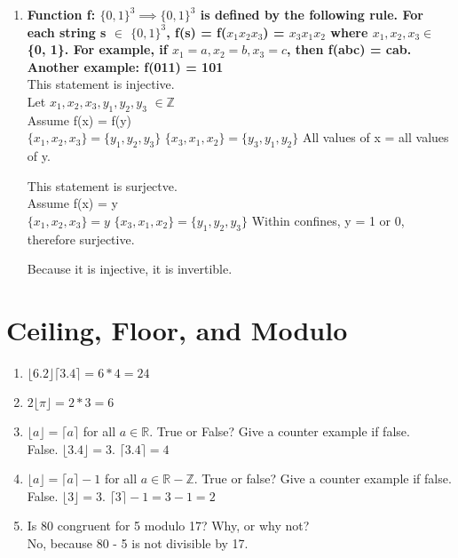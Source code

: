 \documentclass[a4paper]{article}
\begin{document}
\begin{enumerate}
    
    \item \boldmath \textbf{Function f: $\{0, 1\}^3 \implies \{0, 1\}^3$ is defined by the following rule. For each string s $\in$ $\{0, 1\}^3$, f(s) = f($x_1x_2x_3$) = $x_3x_1x_2$ where $x_1, x_2, x_3 \in$ \{0, 1\}. For example, if $x_1 = a, x_2 = b, x_3 = c$, then f(abc) = cab. Another example: f(011) = 101} \unboldmath \\
    This statement is injective. \\
    Let $x_1, x_2, x_3, y_1, y_2, y_3$ $\in \mathbb{Z}$ \\
    Assume f(x) = f(y) \\
    $\{x_1, x_2, x_3\} = \{y_1, y_2, y_3\}$
    $\{x_3, x_1, x_2\} = \{y_3, y_1, y_2\}$
    All values of x = all values of y.
    
    This statement is surjectve.\\
    Assume f(x) = y \\
    $\{x_1, x_2, x_3\} = y$
    $\{x_3, x_1, x_2\} = \{y_1, y_2, y_3\}$
    Within confines, y = 1 or 0, therefore surjective.
    
    Because it is injective, it is invertible.
\end{enumerate}

\section{Ceiling, Floor, and Modulo}
\begin{enumerate}
    \item $\lfloor 6.2 \rfloor \lceil 3.4 \rceil =  6 * 4 = 24$
    \item $2 \lfloor \pi \rfloor = 2 * 3 = 6$
    \item $\lfloor a \rfloor = \lceil a \rceil$ for all $a \in \mathbb{R}$. True or False? Give a counter example if false.\\
    False. $\lfloor 3.4 \rfloor = 3$. $\lceil 3.4 \rceil = 4$
    
    \item $\lfloor a \rfloor = \lceil a \rceil - 1$ for all $a \in \mathbb{R} - \mathbb{Z}$. True or false? Give a counter example if false.\\
    False. $\lfloor 3 \rfloor = 3$. $\lceil 3 \rceil - 1 = 3 - 1 = 2$
    
    \item Is 80 congruent for 5 modulo 17? Why, or why not? \\
    No, because 80 - 5 is not divisible by 17.
\end{enumerate}
\end{document}
